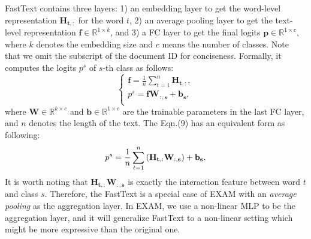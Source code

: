 \documentclass[letterpaper]{article} \usepackage{aaai19}  \usepackage{times}  \usepackage{helvet}  \usepackage{courier}  \usepackage{url}  \usepackage{graphicx}
\begin{document}
FastText contains three layers: 1) an embedding layer to get the word-level representation $\mathbf{H_{t,:}}$ for the word $t$, 2) an average pooling layer to get the text-level representation $\mathbf{f} \in \mathbb{R}^{1 \times k}$, and 3) a FC layer to get the final logits $\mathbf{p} \in \mathbb{R}^{1 \times c}$, where $k$ denotes the embedding size and $c$ means the number of classes. Note that we omit the subscript of the document ID for conciseness. Formally, it computes the logits $p^{s}$ of $s$-th class as follows:
\begin{equation}
\left\{
\begin{array}{lr}
\mathbf{f} = \frac{1}{n}\sum_{t=1}^{n}\mathbf{H_{t,:}},\\
p^{s} = \mathbf{fW_{:,s} + b_{s}},\\
\end{array}
\right.
\end{equation}
where $\mathbf{W} \in \mathbb{R}^{k \times c}$ and $\mathbf{b} \in \mathbb{R}^{1 \times c}$ are the trainable parameters in the last FC layer, and $n$ denotes the length of the text. The Eqn.(9) has an equivalent form as following:
\begin{equation}
p^{s} = \frac{1}{n}\sum_{t=1}^{n}\mathbf{(H_{t,:}W_{:,s}) + b_{s}}.\\
\end{equation}
It is worth noting that $\mathbf{H_{t,:}W_{:,s}}$ is exactly the interaction feature between word $t$ and class $s$. Therefore, the FastText is a special case of EXAM with an \textit{average pooling} as the aggregation layer. In EXAM, we use a non-linear MLP to be the aggregation layer, and it will generalize FastText to a non-linear setting which might be more expressive than the original one.
\end{document}
